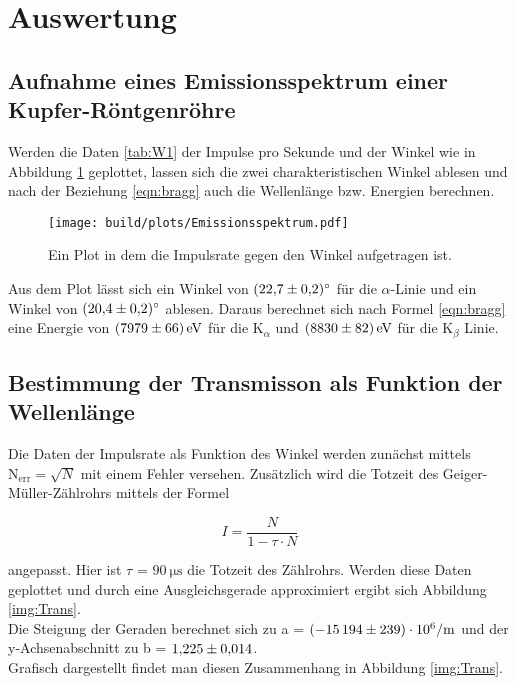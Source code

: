 \section{Auswertung}

    \subsection{Aufnahme eines Emissionsspektrum einer Kupfer-Röntgenröhre}

        \noindent Werden die Daten \ref{tab:W1} der Impulse pro Sekunde und der Winkel wie in Abbildung \ref{img:Spekt} geplottet, lassen sich die zwei 
        charakteristischen Winkel ablesen und nach der Beziehung \ref{eqn:bragg} auch die Wellenlänge bzw. Energien berechnen.

            \begin{figure}
                \centering
                \texttt{[image: build/plots/Emissionsspektrum.pdf]}
                \caption{Ein Plot in dem die Impulsrate gegen den Winkel aufgetragen ist.}
                \label{img:Spekt}
            \end{figure}

        \noindent Aus dem Plot lässt sich ein Winkel von $\SI{22.7 \pm 0.2}{\degree}$ für die $\alpha$-Linie und ein Winkel von $\SI{20.4 \pm 0.2}{\degree}$
        ablesen. Daraus berechnet sich nach Formel \ref{eqn:bragg} eine Energie von $\SI{7979 \pm 66}{\electronvolt}$ für die $\text{K}_{\alpha}$ und
        $\SI{8830 \pm 82}{\electronvolt}$ für die $\text{K}_{\beta}$ Linie. 

    \subsection{Bestimmung der Transmisson als Funktion der Wellenlänge}

        \noindent Die Daten der Impulsrate als Funktion des Winkel werden zunächst mittels $\text{N}_{\text{err}}=\sqrt{N}$ mit einem Fehler versehen.
        Zusätzlich wird die Totzeit des Geiger-Müller-Zählrohrs mittels der Formel 
        
            \begin{equation}
                I = \frac{N}{1 - \tau \cdot N}
            \end{equation}
        
        \noindent angepasst. Hier ist $\tau$ = $\SI{90}{\micro\second}$ die Totzeit des Zählrohrs. Werden diese Daten geplottet und durch eine 
        Ausgleichsgerade approximiert ergibt sich Abbildung \ref{img:Trans}.\\ Die Steigung der Geraden berechnet sich zu 
        a = $\SI{-15194  (239)e6}{\per\meter}$ und der y-Achsenabschnitt zu b = $\num{1.225 \pm 0.014}$.\\
        Grafisch dargestellt findet man diesen Zusammenhang in Abbildung \ref{img:Trans}.

